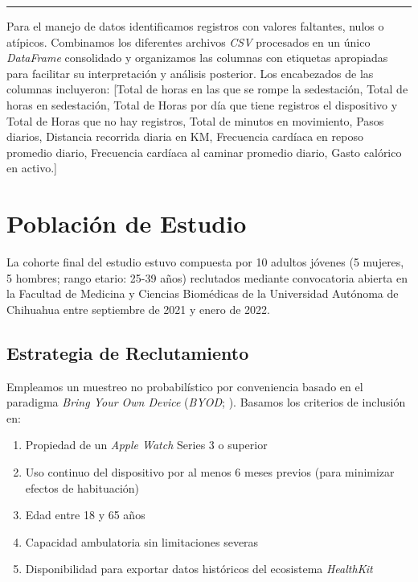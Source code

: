 \noindent\rule{\textwidth}{0.4pt}

Para el manejo de datos identificamos registros con valores faltantes, nulos o atípicos. Combinamos los diferentes archivos \textit{CSV} procesados en un único \textit{DataFrame} consolidado y organizamos las columnas con etiquetas apropiadas para facilitar su interpretación y análisis posterior. Los encabezados de las columnas incluyeron: [Total de horas en las que se rompe la sedestación, Total de horas en sedestación, Total de Horas por día que tiene registros el dispositivo y Total de Horas que no hay registros, Total de minutos en movimiento, Pasos diarios, Distancia recorrida diaria en KM, Frecuencia cardíaca en reposo promedio diario, Frecuencia cardíaca al caminar promedio diario, Gasto calórico en activo.]

\section{Población de Estudio}
\label{sec:poblacion_estudio}

La cohorte final del estudio estuvo compuesta por 10 adultos jóvenes (5 mujeres, 5 hombres; rango etario: 25-39 años) reclutados mediante convocatoria abierta en la Facultad de Medicina y Ciencias Biomédicas de la Universidad Autónoma de Chihuahua entre septiembre de 2021 y enero de 2022.

\subsection{Estrategia de Reclutamiento}
\label{subsec:reclutamiento}

Empleamos un muestreo no probabilístico por conveniencia basado en el paradigma \textit{Bring Your Own Device} (\textit{BYOD}; \cite{Doherty2021}). Basamos los criterios de inclusión en:

\begin{enumerate}
    \item Propiedad de un \textit{Apple Watch} Series 3 o superior
    \item Uso continuo del dispositivo por al menos 6 meses previos (para minimizar efectos de habituación)
    \item Edad entre 18 y 65 años
    \item Capacidad ambulatoria sin limitaciones severas
    \item Disponibilidad para exportar datos históricos del ecosistema \textit{HealthKit}
\end{enumerate}

